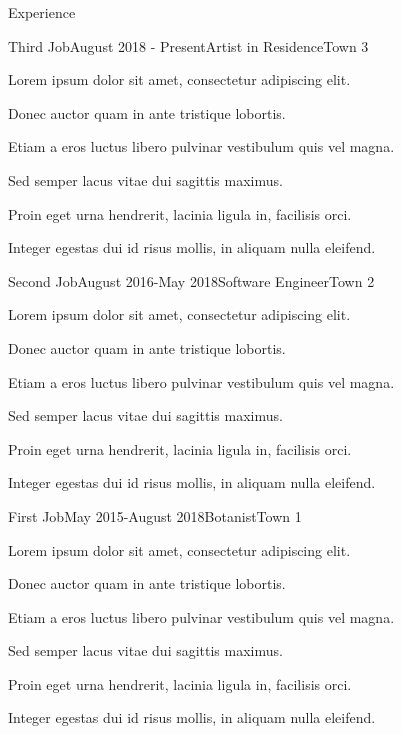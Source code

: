 \documentclass{resume}
\begin{document}
\begin{rSection}{Experience}
  
\begin{rSubsection}{Third Job}{August 2018 - Present}{Artist in Residence}{Town 3}
\item Lorem ipsum dolor sit amet, consectetur adipiscing elit.
\item Donec auctor quam in ante tristique lobortis.
\item Etiam a eros luctus libero pulvinar vestibulum quis vel magna.
\item Sed semper lacus vitae dui sagittis maximus.
\item Proin eget urna hendrerit, lacinia ligula in, facilisis orci.
\item Integer egestas dui id risus mollis, in aliquam nulla eleifend.
\end{rSubsection}

\begin{rSubsection}{Second Job}{August 2016-May 2018}{Software Engineer}{Town 2}
\item Lorem ipsum dolor sit amet, consectetur adipiscing elit.
\item Donec auctor quam in ante tristique lobortis.
\item Etiam a eros luctus libero pulvinar vestibulum quis vel magna.
\item Sed semper lacus vitae dui sagittis maximus.
\item Proin eget urna hendrerit, lacinia ligula in, facilisis orci.
\item Integer egestas dui id risus mollis, in aliquam nulla eleifend.
\end{rSubsection}

\begin{rSubsection}{First Job}{May 2015-August 2018}{Botanist}{Town 1}
\item Lorem ipsum dolor sit amet, consectetur adipiscing elit.
\item Donec auctor quam in ante tristique lobortis.
\item Etiam a eros luctus libero pulvinar vestibulum quis vel magna.
\item Sed semper lacus vitae dui sagittis maximus.
\item Proin eget urna hendrerit, lacinia ligula in, facilisis orci.
\item Integer egestas dui id risus mollis, in aliquam nulla eleifend.
\end{rSubsection}


\end{rSection}
\end{document}
